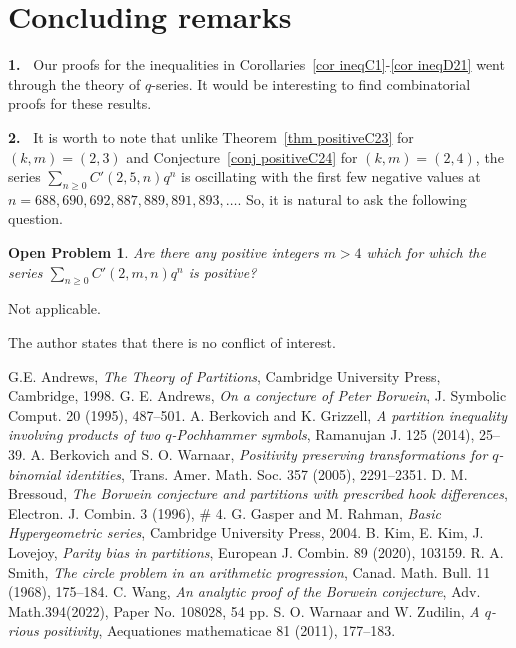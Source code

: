 \documentclass[reqno]{amsart}
\theoremstyle{definition}
\theoremstyle{plain}
\newtheorem{openproblem} {Open Problem}
\theoremstyle{remark}
\numberwithin{equation}{section}
\begin{document}
%
\section{Concluding remarks}\label{sec concluding}
{\bf 1.\ } Our proofs for the inequalities in Corollaries~\ref{cor ineqC1}-\ref{cor ineqD21} went through the theory of $q$-series.
It would be interesting to find combinatorial proofs for these results.

{\bf 2.\ } It is worth to note that unlike Theorem~\ref{thm positiveC23} for $(k,m)=(2,3)$ and Conjecture~\ref{conj positiveC24} for $(k,m)=(2,4)$,
the series $\textstyle \sum_{n\geq 0} C'(2,5,n) q^n$ is oscillating with the first few negative values at $n=688, 690, 692, 887, 889,891,893,\ldots$.
So, it is natural to ask the following question.
%
\begin{openproblem}\label{Problem C2m}
Are there any positive integers $m>4$ which for which the series $\textstyle \sum_{n\geq 0} C'(2,m,n) q^n$ is positive?
\end{openproblem}
%
%
\bigskip
{}
Not applicable.
%

\bigskip
{}
The author states that there is no conflict of interest.
%
\begin{thebibliography}{99}
%
G.E. Andrews,
\emph{The Theory of Partitions},
Cambridge University Press, Cambridge, 1998.
%
G. E. Andrews,
\emph{On a conjecture of Peter Borwein},
J. Symbolic Comput. 20 (1995), 487--501.
%
A. Berkovich and K. Grizzell,
\emph{A partition inequality involving products of two $q$-Pochhammer symbols},
Ramanujan J. 125 (2014), 25--39.
%
A. Berkovich and S. O. Warnaar,
\emph{Positivity preserving transformations for $q$-binomial identities},
Trans. Amer. Math. Soc. 357 (2005), 2291--2351.
%
D. M. Bressoud,
\emph{The Borwein conjecture and partitions with prescribed hook differences},
Electron. J. Combin. 3 (1996), \# 4.
%
G. Gasper and M. Rahman,
\emph{Basic Hypergeometric series},
Cambridge University Press, 2004.
%
B. Kim, E. Kim, J. Lovejoy,
\emph{Parity bias in partitions},
European J. Combin. 89 (2020), 103159.
%
R. A. Smith,
\emph{The circle problem in an arithmetic progression},
Canad. Math. Bull. 11 (1968), 175--184.
%
C. Wang,
\emph{An analytic proof of the Borwein conjecture},
Adv. Math.394(2022), Paper No. 108028, 54 pp.
%
S. O. Warnaar and W. Zudilin,
\emph{A $q$-rious positivity},
Aequationes mathematicae 81 (2011), 177--183.
%
\end{thebibliography}
%
\end{document}
